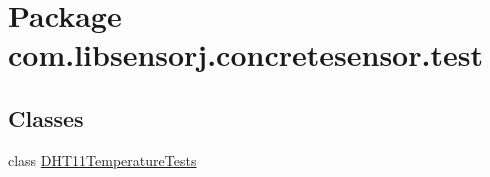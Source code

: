 \hypertarget{namespacecom_1_1libsensorj_1_1concretesensor_1_1test}{}\section{Package com.\+libsensorj.\+concretesensor.\+test}
\label{namespacecom_1_1libsensorj_1_1concretesensor_1_1test}
\subsection*{Classes}
\begin{DoxyCompactItemize}
\item 
class \hyperlink{classcom_1_1libsensorj_1_1concretesensor_1_1test_1_1DHT11TemperatureTests}{D\+H\+T11\+Temperature\+Tests}
\end{DoxyCompactItemize}
